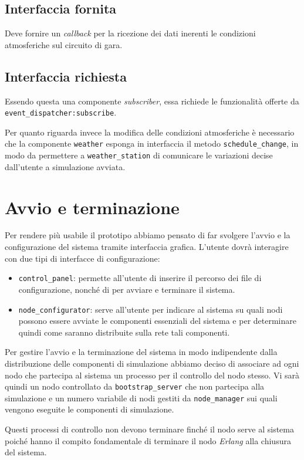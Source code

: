 \documentclass[a4paper]{report}
\newcommand{\Erlang}{\textsl{Erlang}}
\newcommand{\fun}[1]{\texttt{#1}}
\begin{document}
\subsection*{Interfaccia fornita}
Deve fornire un \textit{callback} per la ricezione dei dati inerenti le condizioni atmosferiche sul circuito di gara.
\subsection*{Interfaccia richiesta}
Essendo questa una componente \textit{subscriber}, essa richiede le funzionalità offerte da \fun{event\_dispatcher:subscribe}.

Per quanto riguarda invece la modifica delle condizioni atmosferiche è necessario che la componente \texttt{weather} esponga in interfaccia il metodo \fun{schedule\_change}, in modo da permettere a \texttt{weather\_station} di comunicare le variazioni decise dall'utente a simulazione avviata.

\section{Avvio e terminazione}
\label{sec:start-stop}
Per rendere più usabile il prototipo abbiamo pensato di far svolgere l'avvio e la configurazione del sistema tramite interfaccia grafica.
L'utente dovrà interagire con due tipi di interfacce di configurazione:
\begin{itemize}
\item \texttt{control\_panel}: permette all'utente di inserire il percorso dei file di configurazione, nonché di per avviare e terminare il sistema.
\item \texttt{node\_configurator}: serve all'utente per indicare al sistema su quali nodi possono essere avviate le componenti essenziali del sistema e per determinare quindi come saranno distribuite sulla rete tali componenti.
\end{itemize}
Per gestire l'avvio e la terminazione del sistema in modo indipendente dalla distribuzione delle componenti di simulazione abbiamo deciso di associare ad ogni nodo che partecipa al sistema un processo per il controllo del nodo stesso. Vi sarà quindi un nodo controllato da \texttt{bootstrap\_server} che non partecipa alla simulazione e un numero variabile di nodi gestiti da \texttt{node\_manager} sui quali vengono eseguite le componenti di simulazione.

Questi processi di controllo non devono terminare finché il nodo serve al sistema poiché hanno il compito fondamentale di terminare il nodo \Erlang{} alla chiusura del sistema.
\end{document}
